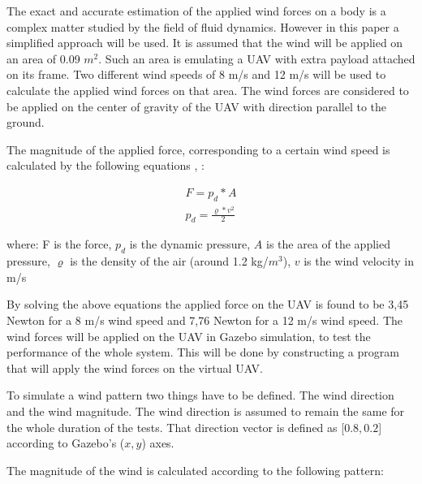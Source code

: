 \documentclass[conference]{IEEEtran}
\begin{document}
The exact and accurate estimation of the applied wind forces on a body is a complex matter studied by the field of fluid dynamics. However in this paper a simplified approach will be used. It is assumed that the wind will be applied on an area of 0.09 \(m^2\). Such an area is emulating a UAV with extra payload attached on its frame. Two different wind speeds of 8 m/s and 12 m/s will be used to calculate the applied wind forces on that area. The wind forces are considered to be applied on the center of gravity of the UAV with direction parallel to the ground.

The magnitude of the applied force, corresponding to a certain wind speed is calculated by the following equations \cite{Dynamic_pressure_NASA}, \cite{Dynamic_pressure_wikipedia}:

\begin{equation}
    \begin{array}{l}
         F = p_{d}  * A  \\
         p_{d} = \frac{\varrho * v^2}{2} 
    \end{array}
\end{equation}

where: F is the force, \(p_{d}\) is the dynamic pressure, \(A\) is the area of the applied pressure, \(\varrho\) is the density of the air (around 1.2 kg/\(m^3\)), \(v\) is the wind velocity in m/s

By solving the above equations the applied force on the UAV is found to be 3,45 Newton for a 8 m/s wind speed and 7,76 Newton for a 12 m/s wind speed. The wind forces will be applied on the UAV in Gazebo simulation, to test the performance of the whole system. This will be done by constructing a program that will apply the wind forces on the virtual UAV.

To simulate a wind pattern two things have to be defined. The wind direction and the wind magnitude. The wind direction is assumed to remain the same for the whole duration of the tests. That direction vector is defined as [\(0.8, 0.2\)] according to Gazebo's (\(x,y\)) axes. 

The magnitude of the wind is calculated according to the following pattern:
\end{document}
